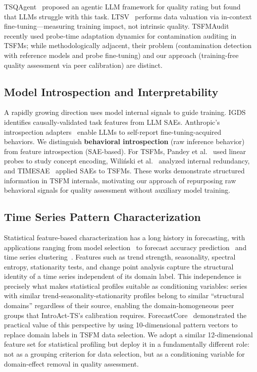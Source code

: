 \documentclass{article}
\begin{document}
TSQAgent~\citep{wu2026tsqagent} proposed an agentic LLM framework for quality rating but found that LLMs struggle with this task. LTSV~\citep{wu2025ltsv} performs data valuation via in-context fine-tuning---measuring training impact, not intrinsic quality. TSFMAudit~\citep{li2026tsfmaudit} recently used probe-time adaptation dynamics for contamination auditing in TSFMs; while methodologically adjacent, their problem (contamination detection with reference models and probe fine-tuning) and our approach (training-free quality assessment via peer calibration) are distinct.

\subsection{Model Introspection and Interpretability}

A rapidly growing direction uses model internal signals to guide training. IGDS~\citep{shi2026igds} identifies causally-validated task features from LLM SAEs. Anthropic's introspection adapters~\citep{anthropic2026introspection} enable LLMs to self-report fine-tuning-acquired behaviors. We distinguish \textbf{behavioral introspection} (raw inference behavior) from feature introspection (SAE-based). For TSFMs, Pandey et al.~\citep{pandey2025internal} used linear probes to study concept encoding, Wili\'nski et al.~\citep{wilinski2025exploring} analyzed internal redundancy, and TIMESAE~\citep{timesae2025} applied SAEs to TSFMs. These works demonstrate structured information in TSFM internals, motivating our approach of repurposing raw behavioral signals for quality assessment without auxiliary model training.

\subsection{Time Series Pattern Characterization}

Statistical feature-based characterization has a long history in forecasting, with applications ranging from model selection~\citep{wang2006characteristic} to forecast accuracy prediction~\citep{kang2017visual} and time series clustering~\citep{liao2005clustering}. Features such as trend strength, seasonality, spectral entropy, stationarity tests, and change point analysis capture the structural identity of a time series independent of its domain label. This independence is precisely what makes statistical profiles suitable as conditioning variables: series with similar trend-seasonality-stationarity profiles belong to similar ``structural domains'' regardless of their source, enabling the domain-homogeneous peer groups that IntroAct-TS's calibration requires. ForecastCore~\citep{forecastcore2026} demonstrated the practical value of this perspective by using 10-dimensional pattern vectors to replace domain labels in TSFM data selection. We adopt a similar 12-dimensional feature set for statistical profiling but deploy it in a fundamentally different role: not as a grouping criterion for data selection, but as a conditioning variable for domain-effect removal in quality assessment.
\end{document}
